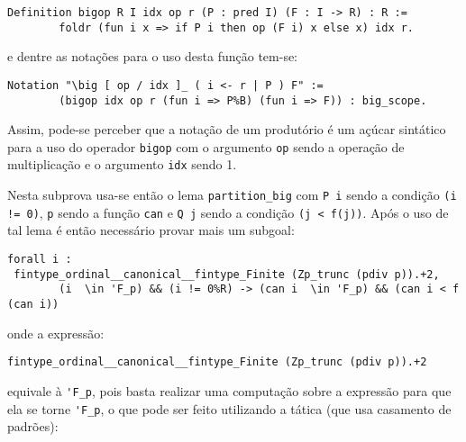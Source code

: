 \begin{enumerate}[label=\textbf{\roman*.}]
\begin{enumerate}[listparindent=\parindent]
                        \begin{lstlisting}[language=coq,frame=single,tabsize=1]
Definition bigop R I idx op r (P : pred I) (F : I -> R) : R :=
        foldr (fun i x => if P i then op (F i) x else x) idx r.
                        \end{lstlisting}
                e dentre as notações para o uso desta função tem-se:

                        \begin{lstlisting}[language=coq,frame=single,tabsize=1]
Notation "\big [ op / idx ]_ ( i <- r | P ) F" :=
        (bigop idx op r (fun i => P%B) (fun i => F)) : big_scope.
                        \end{lstlisting}
                Assim, pode-se perceber que a notação de um produtório é um açúcar sintático para a uso do operador \lstinline[language=coq]|bigop| com o argumento \lstinline[language=coq]|op| sendo a operação de multiplicação e o argumento \lstinline[language=coq]|idx| sendo 1. 
                
                Nesta subprova usa-se então o lema \lstinline[language=coq]|partition_big| com \lstinline[language=coq]|P i| sendo a condição \lstinline[language=coq]|(i != 0)|, \lstinline[language=coq]|p| sendo a função \lstinline[language=coq]|can| e \lstinline[language=coq]|Q j| sendo a condição \lstinline[language=coq]|(j < f(j))|. Após o uso de tal lema é então necessário provar mais um subgoal:
                        \begin{lstlisting}[language=coq,frame=single,tabsize=1]
forall i : 
 fintype_ordinal__canonical__fintype_Finite (Zp_trunc (pdiv p)).+2,
        (i  \in 'F_p) && (i != 0%R) -> (can i  \in 'F_p) && (can i < f (can i))
                        \end{lstlisting}
                onde a expressão:
                
                        \begin{lstlisting}[language=coq,frame=single,tabsize=1]
fintype_ordinal__canonical__fintype_Finite (Zp_trunc (pdiv p)).+2
                        \end{lstlisting}
                equivale à \lstinline[language=coq]|'F_p|, pois basta realizar uma computação sobre a expressão para que ela se torne \lstinline[language=coq]|'F_p|, o que pode ser feito utilizando a tática (que usa casamento de padrões):


\end{enumerate}
\end{enumerate}
